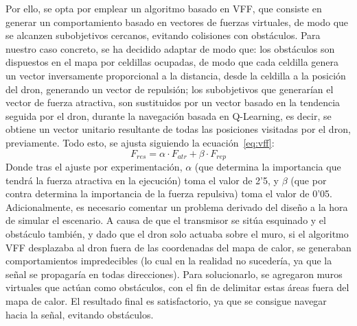 Por ello, se opta por emplear un algoritmo basado en \ac{VFF}, que consiste en generar un comportamiento basado en vectores de fuerzas virtuales, de modo que se alcanzen subobjetivos cercanos, evitando colisiones con obstáculos. Para nuestro caso concreto, se ha decidido adaptar de modo que: los obstáculos son dispuestos en el mapa por celdillas ocupadas, de modo que cada celdilla genera un vector inversamente proporcional a la distancia, desde la celdilla a la posición del dron, generando un vector de repulsión; los subobjetivos que generarían el vector de fuerza atractiva, son sustituidos por un vector basado en la tendencia seguida por el dron, durante la navegación basada en Q-Learning, es decir, se obtiene un vector unitario resultante de todas las posiciones visitadas por el dron, previamente. Todo esto, se ajusta siguiendo la ecuación~\ref{eq:vff}:
\begin{equation}
    F_{res} = \alpha \cdot F_{atr} + \beta \cdot F_{rep}
    \label{eq:vff}
\end{equation}
Donde tras el ajuste por experimentación, $\alpha$ (que determina la importancia que tendrá la fuerza atractiva en la ejecución) toma el valor de 2'5, y $\beta$ (que por contra determina la importancia de la fuerza repulsiva) toma el valor de 0'05. Adicionalmente, es necesario comentar un problema derivado del diseño a la hora de simular el escenario. A causa de que el transmisor se sitúa esquinado y el obstáculo también, y dado que el dron solo actuaba sobre el muro, si el algoritmo \ac{VFF} desplazaba al dron fuera de las coordenadas del mapa de calor, se generaban comportamientos impredecibles (lo cual en la realidad no sucedería, ya que la señal se propagaría en todas direcciones). Para solucionarlo, se agregaron muros virtuales que actúan como obstáculos, con el fin de delimitar estas áreas fuera del mapa de calor. El resultado final es satisfactorio, ya que se consigue navegar hacia la señal, evitando obstáculos.